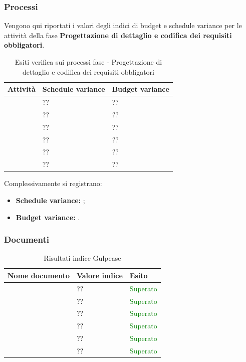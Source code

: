 		\subsubsection{Processi}
		Vengono qui riportati i valori degli indici di budget e schedule variance per le attività della fase \textbf{Progettazione di dettaglio e codifica dei requisiti obbligatori}.
			\begin{table}[!ht]
			\begin{center}
				\begin{tabularx}{0.9\textwidth}{|l|l|X|}
					\hline
					\textbf{Attività} & \textbf{Schedule variance} & \textbf{Budget variance}\\
					\hline						
					\docNameVersionAdR & ?? & ??\\
					\hline
					\docNameVersionGlo & ?? & ??\\
					\hline					
					\docNameVersionNdP & ?? & ??\\
					\hline					
					\docNameVersionPdP & ?? & ??\\
					\hline					
					\docNameVersionPdQ & ?? & ??\\
					\hline					
					\docNameVersionSdF & ?? & ??\\
					\hline				
				\end{tabularx}
			\end{center}
		\caption{Esiti verifica sui processi fase - Progettazione di dettaglio e codifica dei requisiti obbligatori}
	\end{table}
	Complessivamente si registrano:
	\begin{itemize}
	\item \textbf{Schedule variance:} ;
	\item \textbf{Budget variance:} .
	\end{itemize}
	 	\subsubsection{Documenti}
		\begin{table}[!ht]
			\begin{center}
				\begin{tabularx}{0.9\textwidth}{|l|l|X|}
					\hline
					\textbf{Nome documento} & \textbf{Valore indice} & \textbf{Esito}\\
					\hline						
					\docNameVersionAdR & ?? & \textcolor{green}{Superato}\\
					\hline
					\docNameVersionGlo & ?? & \textcolor{green}{Superato}\\
					\hline					
					\docNameVersionNdP & ?? & \textcolor{green}{Superato}\\
					\hline					
					\docNameVersionPdP & ?? & \textcolor{green}{Superato}\\
					\hline					
					\docNameVersionPdQ & ?? & \textcolor{green}{Superato}\\
					\hline					
					\docNameVersionSdF & ?? & \textcolor{green}{Superato}\\
					\hline				
				\end{tabularx}
			\end{center}
			\caption{Risultati indice Gulpease}
		\end{table}
	
